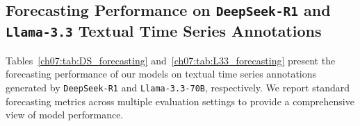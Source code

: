 \begingroup\raggedright
\subsection{Forecasting Performance on \texttt{DeepSeek-R1} and \texttt{Llama-3.3} Textual Time Series Annotations}\label{ch07:apd:full_tables}
\par\endgroup



Tables~\ref{ch07:tab:DS_forecasting} and~\ref{ch07:tab:L33_forecasting} present the forecasting performance of our models on textual time series annotations generated by \texttt{DeepSeek-R1} and \texttt{Llama-3.3-70B}, respectively.
We report standard forecasting metrics across multiple evaluation settings to provide a comprehensive view of model performance. 











\FloatBarrier
